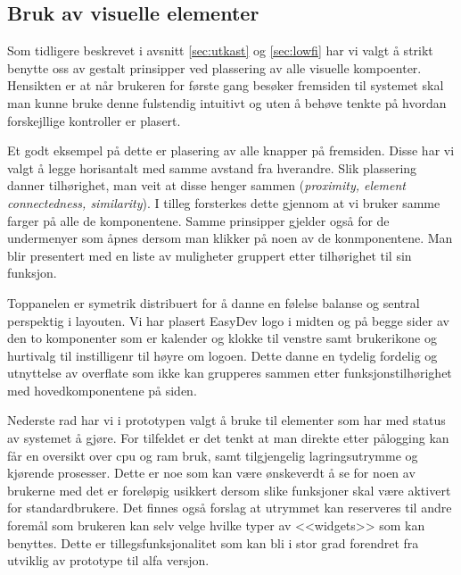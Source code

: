 \subsection{Bruk av visuelle elementer}
Som tidligere beskrevet i avsnitt \ref{sec:utkast} og \ref{sec:lowfi} har vi valgt å strikt benytte oss av gestalt prinsipper ved plassering av alle visuelle kompoenter. Hensikten er at når brukeren for første gang besøker fremsiden til systemet skal man kunne bruke denne fulstendig intuitivt og uten å behøve tenkte på hvordan forskejllige kontroller er plasert. 

Et godt eksempel på dette er plasering av alle knapper på fremsiden. Disse har vi valgt å legge horisantalt med samme avstand fra hverandre. Slik plassering danner tilhørighet, man veit at disse henger sammen (\textit{proximity, element connectedness, similarity}). I tilleg forsterkes dette gjennom at vi bruker samme farger på alle de komponentene.\cite{forelesning:tulpesh}
Samme prinsipper gjelder også for de undermenyer som åpnes dersom man klikker på noen av de konmponentene. Man blir presentert med en liste av muligheter gruppert etter tilhørighet til sin funksjon. 

Toppanelen er symetrik distribuert for å danne en følelse balanse og sentral perspektig i layouten. Vi har plasert EasyDev logo i midten og på begge sider av den to komponenter som er kalender og klokke til venstre samt brukerikone og hurtivalg til instilligenr til høyre om logoen. Dette danne en tydelig fordelig og utnyttelse av overflate som ikke kan grupperes sammen etter funksjonstilhørighet med hovedkomponentene på siden.

Nederste rad har vi i prototypen valgt å bruke til elementer som har med status av systemet å gjøre. For tilfeldet er det tenkt at man direkte etter pålogging kan får en oversikt over cpu og ram bruk, samt tilgjengelig lagringsutrymme og kjørende prosesser. Dette er noe som kan være ønskeverdt å se for noen av brukerne med det er foreløpig usikkert dersom slike funksjoner skal være aktivert for standardbrukere. Det finnes også forslag at utrymmet kan reserveres til andre foremål som brukeren kan selv velge hvilke typer av <<widgets>> som kan benyttes. Dette er tillegsfunksjonalitet som kan bli i stor grad forendret fra utviklig av prototype til alfa versjon.

